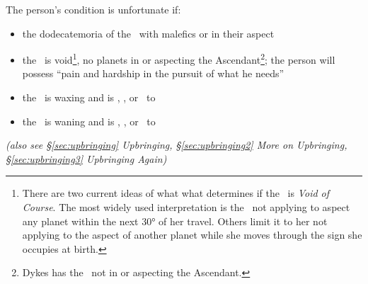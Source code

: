\noindent The person's condition is unfortunate if:
\begin{itemize}[topsep=0em,itemsep=0em]
\item the dodecatemoria of the \Moon\, with malefics or in their aspect
\item the \Moon\, is void\footnote{There are two current ideas of what what determines if the \Moon\, is \textsl{Void of Course}. The most widely used interpretation is the \Moon\, not applying to aspect any planet within the next 30° of her travel. Others limit it to her not applying to the aspect of another planet while she moves through the sign she occupies at birth.}, no planets in or aspecting the Ascendant\footnote{Dykes has the \Moon\, not in or aspecting the Ascendant.}; the  person will possess ``pain and hardship in the pursuit of what he needs''
\item the \Moon\, is waxing and is \Conjunction, \Opposition, or \Square\, to \Mars
\item the \Moon\, is waning and is \Conjunction, \Opposition, or \Square\, to \Saturn
\end{itemize}

\textsl{\small(also see \S\ref{sec:upbringing} Upbringing, \S\ref{sec:upbringing2} More on Upbringing, \S\ref{sec:upbringing3} Upbringing Again)}